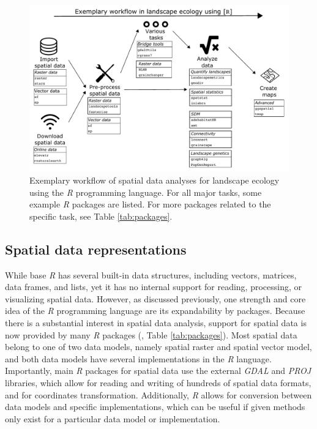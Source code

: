 \documentclass[smallextended]{svjour3}       %
\begin{document}
\begin{figure}
\includegraphics[width=\linewidth]{data/Figure_1} \caption{Exemplary workflow of spatial data analyses for landscape ecology using the \textit{R} programming language. For all major tasks, some example \textit{R} packages are listed. For more packages related to the specific task, see Table \ref{tab:packages}.}\label{fig:fig-workflow}
\end{figure}

\hypertarget{sec:spatrep}{%
\subsection{Spatial data representations}\label{sec:spatrep}}

While base \textit{R} has several built-in data structures, including vectors, matrices, data frames, and lists, yet it has no internal support for reading, processing, or visualizing spatial data.
However, as discussed previously, one strength and core idea of the \textit{R} programming language are its expandability by packages.
Because there is a substantial interest in spatial data analysis, support for spatial data is now provided by many \textit{R} packages (\cite{Lovelace2019}, Table \ref{tab:packages}).
Most spatial data belong to one of two data models, namely spatial raster and spatial vector model, and both data models have several implementations in the \textit{R} language.
Importantly, main \textit{R} packages for spatial data use the external \textit{GDAL} \cite{GDAL/OGRcontributors2020} and \textit{PROJ} \cite{PROJcontributors2021} libraries, which allow for reading and writing of hundreds of spatial data formats, and for coordinates transformation.
Additionally, \textit{R} allows for conversion between data models and specific implementations, which can be useful if given methods only exist for a particular data model or implementation.
\end{document}
